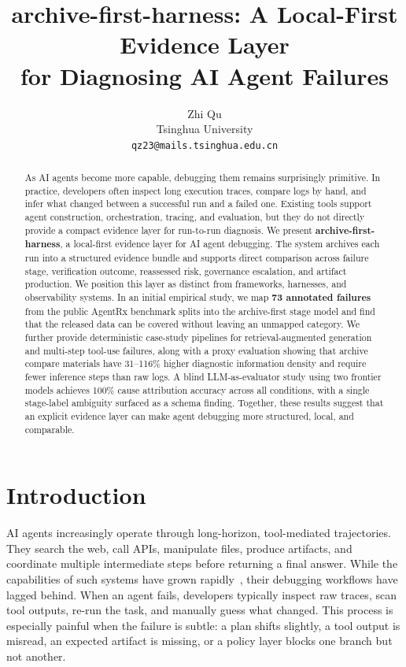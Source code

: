 \documentclass[11pt]{article}
\title{archive-first-harness: A Local-First Evidence Layer\\for Diagnosing AI Agent Failures}
\author{
  Zhi Qu \\
  Tsinghua University \\
  \texttt{qz23@mails.tsinghua.edu.cn}
}
\begin{document}
\maketitle

\begin{abstract}
As AI agents become more capable, debugging them remains surprisingly primitive. In practice, developers often inspect long execution traces, compare logs by hand, and infer what changed between a successful run and a failed one. Existing tools support agent construction, orchestration, tracing, and evaluation, but they do not directly provide a compact evidence layer for run-to-run diagnosis. We present \textbf{archive-first-harness}, a local-first evidence layer for AI agent debugging. The system archives each run into a structured evidence bundle and supports direct comparison across failure stage, verification outcome, reassessed risk, governance escalation, and artifact production. We position this layer as distinct from frameworks, harnesses, and observability systems. In an initial empirical study, we map \textbf{73 annotated failures} from the public AgentRx benchmark splits into the archive-first stage model and find that the released data can be covered without leaving an unmapped category. We further provide deterministic case-study pipelines for retrieval-augmented generation and multi-step tool-use failures, along with a proxy evaluation showing that archive compare materials have 31--116\% higher diagnostic information density and require fewer inference steps than raw logs. A blind LLM-as-evaluator study using two frontier models achieves 100\% cause attribution accuracy across all conditions, with a single stage-label ambiguity surfaced as a schema finding. Together, these results suggest that an explicit evidence layer can make agent debugging more structured, local, and comparable.
\end{abstract}

\section{Introduction}

AI agents increasingly operate through long-horizon, tool-mediated trajectories. They search the web, call APIs, manipulate files, produce artifacts, and coordinate multiple intermediate steps before returning a final answer. While the capabilities of such systems have grown rapidly~\cite{plaat2025agentic,guo2024llm}, their debugging workflows have lagged behind. When an agent fails, developers typically inspect raw traces, scan tool outputs, re-run the task, and manually guess what changed. This process is especially painful when the failure is subtle: a plan shifts slightly, a tool output is misread, an expected artifact is missing, or a policy layer blocks one branch but not another.
\end{document}
